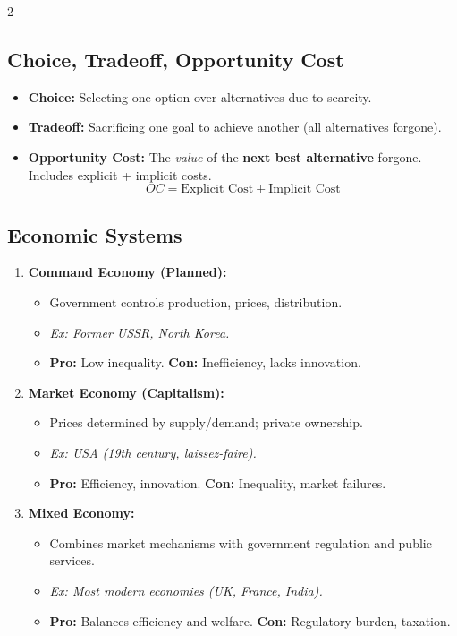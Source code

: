 \documentclass[10pt,a4paper]{article}
\begin{document}
\begin{multicols}{2}
\subsection*{Choice, Tradeoff, Opportunity Cost}
\begin{itemize}[leftmargin=*,nosep]
    \item \textbf{Choice:} Selecting one option over alternatives due to scarcity.
    \item \textbf{Tradeoff:} Sacrificing one goal to achieve another (all alternatives forgone).
    \item \textbf{Opportunity Cost:} The \textit{value} of the \textbf{next best alternative} forgone. Includes explicit + implicit costs.
    \[ OC = \text{Explicit Cost} + \text{Implicit Cost} \]
\end{itemize}

\subsection*{Economic Systems}
\begin{enumerate}[leftmargin=*,nosep]
    \item \textbf{Command Economy (Planned):}
    \begin{itemize}[nosep]
        \item Government controls production, prices, distribution.
        \item \textit{Ex: Former USSR, North Korea.}
        \item \textbf{Pro:} Low inequality. \textbf{Con:} Inefficiency, lacks innovation.
    \end{itemize}
    \item \textbf{Market Economy (Capitalism):}
    \begin{itemize}[nosep]
        \item Prices determined by supply/demand; private ownership.
        \item \textit{Ex: USA (19th century, laissez-faire).}
        \item \textbf{Pro:} Efficiency, innovation. \textbf{Con:} Inequality, market failures.
    \end{itemize}
    \item \textbf{Mixed Economy:}
    \begin{itemize}[nosep]
        \item Combines market mechanisms with government regulation and public services.
        \item \textit{Ex: Most modern economies (UK, France, India).}
        \item \textbf{Pro:} Balances efficiency and welfare. \textbf{Con:} Regulatory burden, taxation.
    \end{itemize}
\end{enumerate}


\end{multicols}
\end{document}
